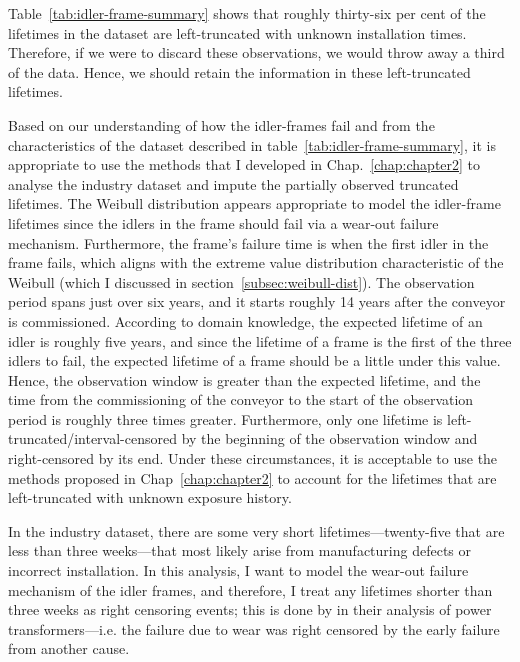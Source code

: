 Table~\ref{tab:idler-frame-summary} shows that roughly thirty-six per cent of the lifetimes in the dataset are left-truncated with unknown installation times. Therefore, if we were to discard these observations, we would throw away a third of the data. Hence, we should retain the information in these left-truncated lifetimes.

Based on our understanding of how the idler-frames fail and from the characteristics of the dataset described in table~\ref{tab:idler-frame-summary}, it is appropriate to use the methods that I developed in Chap.~\ref{chap:chapter2} to analyse the industry dataset and impute the partially observed truncated lifetimes. The Weibull distribution appears appropriate to model the idler-frame lifetimes since the idlers in the frame should fail via a wear-out failure mechanism. Furthermore, the frame's failure time is when the first idler in the frame fails, which aligns with the extreme value distribution characteristic of the Weibull (which I discussed in section~\ref{subsec:weibull-dist}). The observation period spans just over six years, and it starts roughly 14 years after the conveyor is commissioned. According to domain knowledge, the expected lifetime of an idler is roughly five years, and since the lifetime of a frame is the first of the three idlers to fail, the expected lifetime of a frame should be a little under this value. Hence, the observation window is greater than the expected lifetime, and the time from the commissioning of the conveyor to the start of the observation period is roughly three times greater. Furthermore, only one lifetime is left-truncated/interval-censored by the beginning of the observation window and right-censored by its end. Under these circumstances, it is acceptable to use the methods proposed in Chap~\ref{chap:chapter2} to account for the lifetimes that are left-truncated with unknown exposure history.

In the industry dataset, there are some very short lifetimes---twenty-five that are less than three weeks---that most likely arise from manufacturing defects or incorrect installation. In this analysis, I want to model the wear-out failure mechanism of the idler frames, and therefore, I treat any lifetimes shorter than three weeks as right censoring events; this is done by \citet{hong2009} in their analysis of power transformers---i.e. the failure due to wear was right censored by the early failure from another cause.

